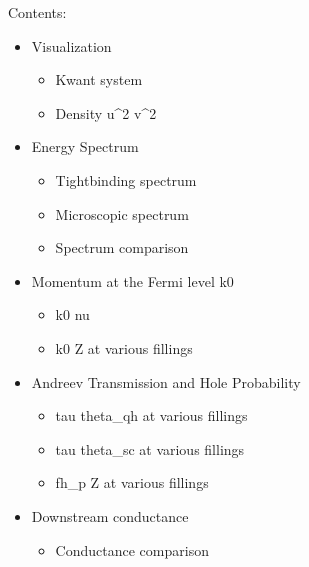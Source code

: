 \documentclass[letterpaper,10pt,english]{sphinxmanual}
\begin{document}
\sphinxAtStartPar
Contents:
\begin{itemize}
\item {} 
\sphinxAtStartPar
Visualization
\begin{itemize}
\item {} 
\sphinxAtStartPar
Kwant system

\item {} 
\sphinxAtStartPar
Density u\textasciicircum{}2 \sphinxhyphen{} v\textasciicircum{}2

\end{itemize}

\item {} 
\sphinxAtStartPar
Energy Spectrum
\begin{itemize}
\item {} 
\sphinxAtStartPar
Tight\sphinxhyphen{}binding spectrum

\item {} 
\sphinxAtStartPar
Microscopic spectrum

\item {} 
\sphinxAtStartPar
Spectrum comparison

\end{itemize}

\item {} 
\sphinxAtStartPar
Momentum at the Fermi level k0
\begin{itemize}
\item {} 
\sphinxAtStartPar
k0  nu

\item {} 
\sphinxAtStartPar
k0  Z at various fillings

\end{itemize}

\item {} 
\sphinxAtStartPar
Andreev Transmission and Hole Probability
\begin{itemize}
\item {} 
\sphinxAtStartPar
tau  theta\_qh at various fillings

\item {} 
\sphinxAtStartPar
tau  theta\_sc at various fillings

\item {} 
\sphinxAtStartPar
fh\_p  Z at various fillings

\end{itemize}

\item {} 
\sphinxAtStartPar
Downstream conductance
\begin{itemize}
\item {} 
\sphinxAtStartPar
Conductance comparison


\end{itemize}
\end{itemize}
\end{document}
